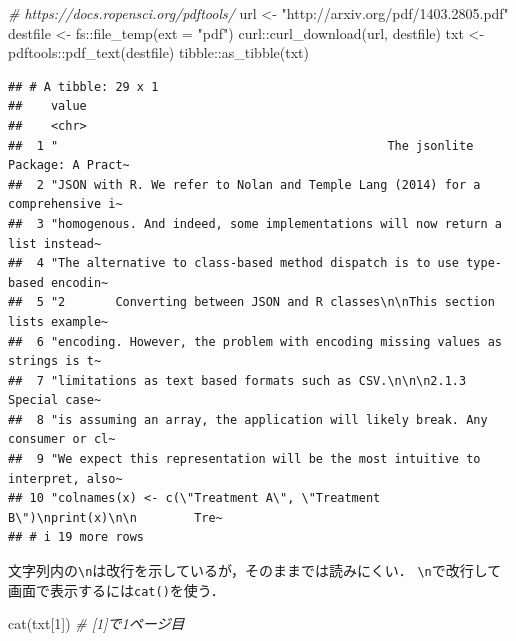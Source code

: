 \documentclass[
]{article}
\newenvironment{Shaded}{\begin{snugshade}}{\end{snugshade}}
\newcommand{\AttributeTok}[1]{\textcolor[rgb]{0.77,0.63,0.00}{#1}}
\newcommand{\CommentTok}[1]{\textcolor[rgb]{0.56,0.35,0.01}{\textit{#1}}}
\newcommand{\DecValTok}[1]{\textcolor[rgb]{0.00,0.00,0.81}{#1}}
\newcommand{\FunctionTok}[1]{\textcolor[rgb]{0.00,0.00,0.00}{#1}}
\newcommand{\NormalTok}[1]{#1}
\newcommand{\OtherTok}[1]{\textcolor[rgb]{0.56,0.35,0.01}{#1}}
\newcommand{\SpecialCharTok}[1]{\textcolor[rgb]{0.00,0.00,0.00}{#1}}
\newcommand{\StringTok}[1]{\textcolor[rgb]{0.31,0.60,0.02}{#1}}
\begin{document}
\begin{Shaded}
\begin{Highlighting}[]
  \CommentTok{\# https://docs.ropensci.org/pdftools/}
\NormalTok{url }\OtherTok{\textless{}{-}} \StringTok{"http://arxiv.org/pdf/1403.2805.pdf"}
\NormalTok{destfile }\OtherTok{\textless{}{-}}\NormalTok{ fs}\SpecialCharTok{::}\FunctionTok{file\_temp}\NormalTok{(}\AttributeTok{ext =} \StringTok{"pdf"}\NormalTok{)}
\NormalTok{curl}\SpecialCharTok{::}\FunctionTok{curl\_download}\NormalTok{(url, destfile)}
\NormalTok{txt }\OtherTok{\textless{}{-}}\NormalTok{ pdftools}\SpecialCharTok{::}\FunctionTok{pdf\_text}\NormalTok{(destfile)}
\NormalTok{tibble}\SpecialCharTok{::}\FunctionTok{as\_tibble}\NormalTok{(txt)}
\end{Highlighting}
\end{Shaded}

\begin{verbatim}
## # A tibble: 29 x 1
##    value                                                                        
##    <chr>                                                                        
##  1 "                                              The jsonlite Package: A Pract~
##  2 "JSON with R. We refer to Nolan and Temple Lang (2014) for a comprehensive i~
##  3 "homogenous. And indeed, some implementations will now return a list instead~
##  4 "The alternative to class-based method dispatch is to use type-based encodin~
##  5 "2       Converting between JSON and R classes\n\nThis section lists example~
##  6 "encoding. However, the problem with encoding missing values as strings is t~
##  7 "limitations as text based formats such as CSV.\n\n\n2.1.3      Special case~
##  8 "is assuming an array, the application will likely break. Any consumer or cl~
##  9 "We expect this representation will be the most intuitive to interpret, also~
## 10 "colnames(x) <- c(\"Treatment A\", \"Treatment B\")\nprint(x)\n\n        Tre~
## # i 19 more rows
\end{verbatim}

文字列内の\texttt{\textbackslash{}n}は改行を示しているが，そのままでは読みにくい．
\texttt{\textbackslash{}n}で改行して画面で表示するには\texttt{cat()}を使う．

\begin{Shaded}
\begin{Highlighting}[]
\FunctionTok{cat}\NormalTok{(txt[}\DecValTok{1}\NormalTok{])  }\CommentTok{\# [1]で1ページ目}
\end{Highlighting}
\end{Shaded}
\end{document}
